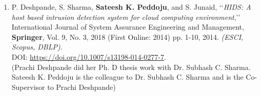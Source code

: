 \begin{enumerate}
	\item
	P. Deshpande, S. Sharma, \textbf{Sateesh K. Peddoju}, and S. Junaid, \lq\lq \textit{HIDS: A host based intrusion detection system for cloud computing environment},\rq\rq\, International Journal of System Assurance Engineering and Management, \textbf{Springer}, Vol. 9, No. 3, 2018 (First Online: 2014) pp. 1-10, 2014. \emph{(ESCI, Scopus, DBLP)}. \\DOI: \url{https://doi.org/10.1007/s13198-014-0277-7}.  \\(Prachi Deshpande did her Ph. D thesis work with Dr. Subhash C. Sharma. Sateesh K. Peddoju is the colleague to Dr. Subhash C. Sharma and is the Co-Supervisor to Prachi Deshpande)
	
	
\end{enumerate}		